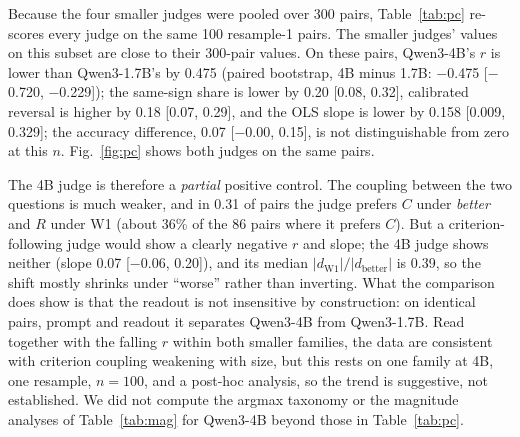 \documentclass[conference]{IEEEtran}
\begin{document}
Because the four smaller judges were pooled over 300 pairs, Table~\ref{tab:pc} re-scores every judge on the
same 100 resample-1 pairs. The smaller judges' values on this subset are close to their 300-pair values. On these
pairs, Qwen3-4B's $r$ is lower than Qwen3-1.7B's by 0.475 (paired bootstrap, 4B minus 1.7B: $-$0.475
[$-$0.720, $-$0.229]); the same-sign share is lower by 0.20 [0.08, 0.32], calibrated reversal is higher by 0.18
[0.07, 0.29], and the OLS slope is lower by 0.158 [0.009, 0.329]; the accuracy difference, 0.07 [$-$0.00, 0.15],
is not distinguishable from zero at this $n$. Fig.~\ref{fig:pc} shows both judges on the same pairs.

The 4B judge is therefore a \emph{partial} positive control. The coupling between the two questions is much
weaker, and in 0.31 of pairs the judge prefers $C$ under \emph{better} and $R$ under W1 (about 36\% of the 86
pairs where it prefers $C$). But a criterion-following judge would show a clearly negative $r$ and slope; the
4B judge shows neither (slope 0.07 [$-$0.06, 0.20]), and its median $|d_\mathrm{W1}|/|d_\mathrm{better}|$ is
0.39, so the shift mostly shrinks under ``worse'' rather than inverting. What the comparison does show is that
the readout is not insensitive by construction: on identical pairs, prompt and readout it separates Qwen3-4B
from Qwen3-1.7B. Read together with the falling $r$ within both smaller families, the data are consistent with
criterion coupling weakening with size, but this rests on one family at 4B, one resample, $n=100$, and a
post-hoc analysis, so the trend is suggestive, not established. We did not compute the argmax taxonomy or
the magnitude analyses of Table~\ref{tab:mag} for Qwen3-4B beyond those in Table~\ref{tab:pc}.
\end{document}
